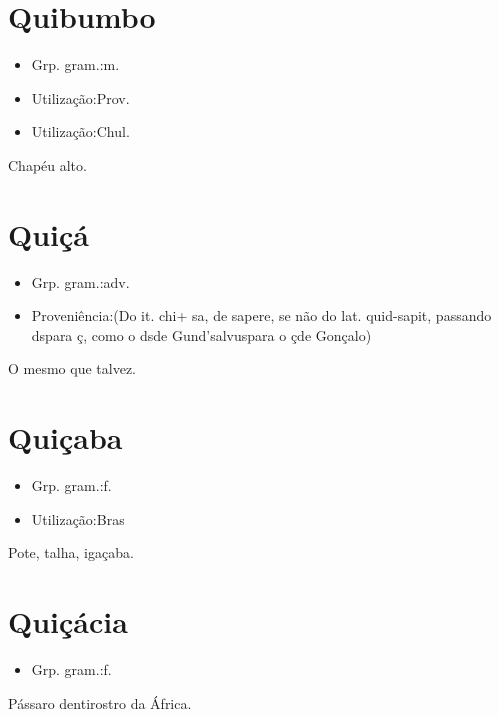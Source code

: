 \section{Quibumbo}
\begin{itemize}
\item {Grp. gram.:m.}
\end{itemize}
\begin{itemize}
\item {Utilização:Prov.}
\end{itemize}
\begin{itemize}
\item {Utilização:Chul.}
\end{itemize}
Chapéu alto.
\section{Quiçá}
\begin{itemize}
\item {Grp. gram.:adv.}
\end{itemize}
\begin{itemize}
\item {Proveniência:(Do it. \textunderscore chi\textunderscore  + \textunderscore sa\textunderscore , de \textunderscore sapere\textunderscore , se não do lat. \textunderscore quid-sapit\textunderscore , passando \textunderscore ds\textunderscore  para \textunderscore ç\textunderscore , como o \textunderscore ds\textunderscore  de \textunderscore Gund'salvus\textunderscore  para o \textunderscore ç\textunderscore  de \textunderscore Gonçalo\textunderscore )}
\end{itemize}
O mesmo que \textunderscore talvez\textunderscore .
\section{Quiçaba}
\begin{itemize}
\item {Grp. gram.:f.}
\end{itemize}
\begin{itemize}
\item {Utilização:Bras}
\end{itemize}
Pote, talha, igaçaba.
\section{Quiçácia}
\begin{itemize}
\item {Grp. gram.:f.}
\end{itemize}
Pássaro dentirostro da África.
